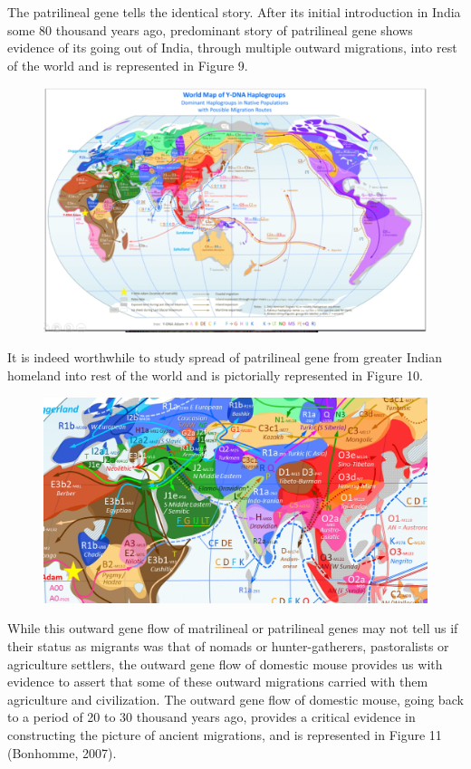 The patrilineal gene tells the identical story. After its initial introduction in India some 80 thousand years ago, predominant story of patrilineal gene shows evidence of its going out of India, through multiple outward migrations, into rest of the world and is represented in Figure 9.

\begin{figure}[!htbp]
\includegraphics[scale=0.22]{"images/8-09.jpg"}
\caption{}\label{art8-fig09}
\end{figure}

It is indeed worthwhile to study spread of patrilineal gene from greater Indian homeland into rest of the world and is pictorially represented in Figure 10.

\newpage

\begin{figure}[!htbp]
\includegraphics[scale=0.21]{"images/8-10.jpg"}
\caption{}\label{art8-fig10}
\end{figure}

While this outward gene flow of matrilineal or patrilineal genes may not tell us if their status as migrants was that of nomads or hunter-gatherers, pastoralists or agriculture settlers, the outward gene flow of domestic mouse provides us with evidence to assert that some of these outward migrations carried with them agriculture and civilization. The outward gene flow of domestic mouse, going back to a period of 20 to 30 thousand years ago, provides a critical evidence in constructing the picture of ancient migrations, and is represented in Figure 11 (Bonhomme, 2007).

